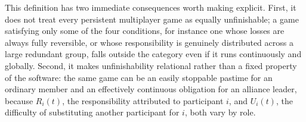 \documentclass[11pt]{article}
\begin{document}
\begin{center}
\end{center}

This definition has two immediate consequences worth making explicit. First, it does not treat every persistent multiplayer game as equally unfinishable; a game satisfying only some of the four conditions, for instance one whose losses are always fully reversible, or whose responsibility is genuinely distributed across a large redundant group, falls outside the category even if it runs continuously and globally. Second, it makes unfinishability relational rather than a fixed property of the software: the same game can be an easily stoppable pastime for an ordinary member and an effectively continuous obligation for an alliance leader, because $R_i(t)$, the responsibility attributed to participant $i$, and $U_i(t)$, the difficulty of substituting another participant for $i$, both vary by role.
\end{document}
